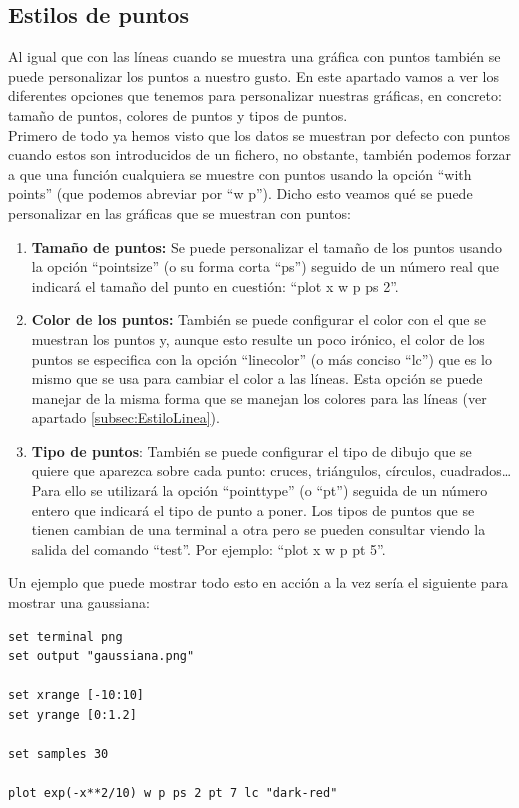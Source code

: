 \documentclass[11pt,a4paper,twoside,pdf]{article}
\numberwithin{equation}{section}
\begin{document}
\subsection{Estilos de puntos\label{subsec:EstiloPuntos}}

Al igual que con las líneas cuando se muestra una gráfica con puntos también se puede personalizar los puntos a nuestro gusto. En este apartado vamos a ver los diferentes opciones que tenemos para personalizar nuestras gráficas, en concreto: tamaño de puntos, colores de puntos y tipos de puntos.\\

Primero de todo ya hemos visto que los datos se muestran por defecto con puntos cuando estos son introducidos de un fichero, no obstante, también podemos forzar a que una función cualquiera se muestre con puntos usando la opción ``with points'' (que podemos abreviar por ``w p''). Dicho esto veamos qué se puede personalizar en las gráficas que se muestran con puntos:

\begin{enumerate}
	\item \textbf{Tamaño de puntos:} Se puede personalizar el tamaño de los puntos usando la opción ``pointsize'' (o su forma corta ``ps'') seguido de un número real que indicará el tamaño del punto en  cuestión: ``plot x w p ps 2''.
	\item \textbf{Color de los puntos:} También se puede configurar el color con el que se muestran los puntos y, aunque esto resulte un poco irónico, el color de los puntos se especifica con la opción ``linecolor'' (o más conciso ``lc'') que es lo mismo que se usa para cambiar el color a las líneas. Esta opción se puede manejar de la misma forma que se manejan los colores para las líneas (ver apartado \ref{subsec:EstiloLinea}).
	\item \textbf{Tipo de puntos}: También se puede configurar el tipo de dibujo que se quiere que aparezca sobre cada punto: cruces, triángulos, círculos, cuadrados\ldots Para ello se utilizará la opción ``pointtype'' (o ``pt'') seguida de un número entero que indicará el tipo de punto a poner. Los tipos de puntos que se tienen cambian de una terminal a otra pero se pueden consultar viendo la salida del comando ``test''. Por ejemplo: ``plot x w p pt 5''.
\end{enumerate}

Un ejemplo que puede mostrar todo esto en acción a la vez sería el siguiente para mostrar una gaussiana:

\begin{lstlisting}[language=Gnuplot]
set terminal png
set output "gaussiana.png"

set xrange [-10:10]
set yrange [0:1.2]

set samples 30

plot exp(-x**2/10) w p ps 2 pt 7 lc "dark-red"
\end{lstlisting}
\end{document}
